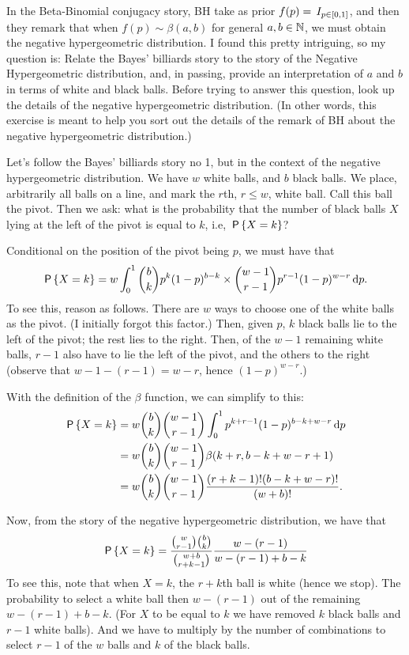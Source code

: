 \documentclass[lectures]{subfiles}
\begin{document}
\begin{exercise}
In the Beta-Binomial conjugacy story, BH take as prior $f(p) = \1{p\in [0,1]}$, and then they remark that when $f(p) \sim \beta(a,b)$ for general $a, b \in \N$, we must obtain the negative hypergeometric distribution.
I found this pretty intriguing, so my question is: Relate the Bayes' billiards story to the story of the Negative Hypergeometric distribution, and, in passing, provide an interpretation of $a$ and $b$ in terms of white and black balls.
Before trying to answer this question, look up the details of the negative hypergeometric distribution.
(In other words, this exercise is meant to help you sort out the details of the remark of BH about the negative hypergeometric distribution.)
\begin{solution}
  Let's follow the Bayes' billiards story no 1, but in the context of the negative hypergeometric distribution.
  We have $w$ white balls, and $b$ black balls.
  We place, arbitrarily all balls on a line, and mark the $r$th, $r\leq w$, white ball.
  Call this ball the pivot.
  Then we ask:  what is the probability that the number of black balls $X$ lying at the left of the pivot is equal to $k$, i.e, $\P{X=k}$?

Conditional on the position of the pivot being $p$, we must have that
\begin{equation}
\label{eq:73}
\P{X=k} = w \int_0^1{b \choose k} p^k(1-p)^{b-k} \times {w -1 \choose r-1}p^{r-1} (1-p)^{w-r} \d p.
\end{equation}
To see this, reason as follows.
There are $w$ ways to choose one of the white balls as the pivot.
(I initially forgot this factor.)
Then, given $p$, $k$ black balls lie to the left of the pivot; the rest lies to the right.
Then, of the $w-1$ remaining white balls, $r-1$ also have to lie the left of the pivot, and the others to the right (observe that $w-1 - (r-1) = w -r$, hence $(1-p)^{w-r}$.)

With the definition of the  $\beta$ function, we can simplify to this:
\begin{align}
\P{X=k}
&= w{b \choose k} {w -1 \choose r-1}  \int_0^1 p^{k+r-1}(1-p)^{b-k+w-r} \d p \\
&= w{b \choose k} {w -1 \choose r-1}  \beta(k+r, b-k+w-r + 1)\\
&= w{b \choose k} {w -1 \choose r-1} \frac{(r+k-1)! (b-k+w-r)!}{(w+b)!}.
\end{align}

Now, from the story of the negative hypergeometric distribution, we have that
\begin{align}
\P{X=k}
&= \frac{{w \choose r-1}{b \choose k}}{{w+b \choose r+k -1}}\frac{w-(r-1)}{w -(r-1) +b-k} \\
\end{align}
To see this, note that when $X=k$, the $r+k$th ball is white (hence we stop).
The probability to select a white ball then $w-(r-1)$ out of the remaining $w-(r-1) + b-k$.
(For $X$ to be equal to $k$ we have removed $k$ black balls and $r-1$ white balls).
And we have to multiply by the number of combinations to select $r-1$ of the $w$ balls and $k$ of the black balls.



\end{solution}
\end{exercise}
\end{document}
